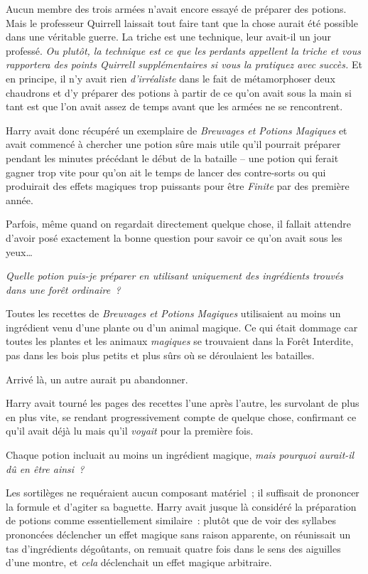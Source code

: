 Aucun membre des trois armées n'avait encore essayé de préparer des potions. Mais le professeur Quirrell laissait tout faire tant que la chose aurait été possible dans une véritable guerre. La triche est une technique, leur avait-il un jour professé. \emph{Ou plutôt, la technique est ce que les perdants appellent la triche et vous rapportera des points Quirrell supplémentaires si vous la pratiquez avec succès.} Et en principe, il n'y avait rien \emph{d'irréaliste} dans le fait de métamorphoser deux chaudrons et d'y préparer des potions à partir de ce qu'on avait sous la main si tant est que l'on avait assez de temps avant que les armées ne se rencontrent.

Harry avait donc récupéré un exemplaire de \emph{Breuvages et Potions Magiques} et avait commencé à chercher une potion sûre mais utile qu'il pourrait préparer pendant les minutes précédant le début de la bataille -- une potion qui ferait gagner trop vite pour qu'on ait le temps de lancer des contre-sorts ou qui produirait des effets magiques trop puissants pour être \emph{Finite} par des première année.

Parfois, même quand on regardait directement quelque chose, il fallait attendre d'avoir posé exactement la bonne question pour savoir ce qu'on avait sous les yeux…

\emph{Quelle potion puis-je préparer en utilisant uniquement des ingrédients trouvés dans une forêt ordinaire~?}

Toutes les recettes de \emph{Breuvages et Potions Magiques} utilisaient au moins un ingrédient venu d'une plante ou d'un animal magique. Ce qui était dommage car toutes les plantes et les animaux \emph{magiques} se trouvaient dans la Forêt Interdite, pas dans les bois plus petits et plus sûrs où se déroulaient les batailles.

Arrivé là, un autre aurait pu abandonner.

Harry avait tourné les pages des recettes l'une après l'autre, les survolant de plus en plus vite, se rendant progressivement compte de quelque chose, confirmant ce qu'il avait déjà lu mais qu'il \emph{voyait} pour la première fois.

Chaque potion incluait au moins un ingrédient magique, \emph{mais pourquoi aurait-il dû en être ainsi~?}

Les sortilèges ne requéraient aucun composant matériel~; il suffisait de prononcer la formule et d'agiter sa baguette. Harry avait jusque là considéré la préparation de potions comme essentiellement similaire~: plutôt que de voir des syllabes prononcées déclencher un effet magique sans raison apparente, on réunissait un tas d'ingrédients dégoûtants, on remuait quatre fois dans le sens des aiguilles d'une montre, et \emph{cela} déclenchait un effet magique arbitraire.

